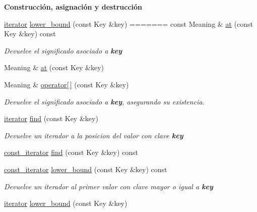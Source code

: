 \begin{Indent}{\bf \-Construcción, asignación y destrucción}
\begin{Indent}
\begin{DoxyCompactItemize}
\hyperlink{classaed2_1_1iterator_1_1iterator}{iterator} \hyperlink{classaed2_1_1iterator_ac48bbb54fea69c1fb4c093eecda02c5a_ac48bbb54fea69c1fb4c093eecda02c5a}{lower\-\_\-bound} (const \-Key \&key)
=======
const Meaning \& \hyperlink{classaed2_1_1iterator_a5a443b1a5d288b9512a6698b92cb415d_a5a443b1a5d288b9512a6698b92cb415d}{at} (const Key \&key) const
\begin{DoxyCompactList}\small\item\em Devuelve el significado asociado a {\bfseries key} \end{DoxyCompactList}\item 
Meaning \& \hyperlink{classaed2_1_1iterator_ac0459c685868fba041b9be2cde974119_ac0459c685868fba041b9be2cde974119}{at} (const Key \&key)
\item 
Meaning \& \hyperlink{classaed2_1_1iterator_af74d214f3278d8cd6b3a5a721e173fa3_af74d214f3278d8cd6b3a5a721e173fa3}{operator\mbox{[}$\,$\mbox{]}} (const Key \&key)
\begin{DoxyCompactList}\small\item\em Devuelve el significado asociado a {\bfseries key}, asegurando su existencia. \end{DoxyCompactList}\item 
\hyperlink{classaed2_1_1iterator_1_1iterator}{iterator} \hyperlink{classaed2_1_1iterator_a3d87256cbfc935a932677092ec57f49a_a3d87256cbfc935a932677092ec57f49a}{find} (const Key \&key)
\begin{DoxyCompactList}\small\item\em Devuelve un iterador a la posicion del valor con clave {\bfseries key} \end{DoxyCompactList}\item 
\hyperlink{classaed2_1_1iterator_1_1const__iterator}{const\+\_\+iterator} \hyperlink{classaed2_1_1iterator_a21b4a52c60fc70ef482e174325e8fec5_a21b4a52c60fc70ef482e174325e8fec5}{find} (const Key \&key) const
\item 
\hyperlink{classaed2_1_1iterator_1_1const__iterator}{const\+\_\+iterator} \hyperlink{classaed2_1_1iterator_aa7366926b6328e4f2e80484944408cbc_aa7366926b6328e4f2e80484944408cbc}{lower\+\_\+bound} (const Key \&key) const
\begin{DoxyCompactList}\small\item\em Devuelve un iterador al primer valor con clave mayor o igual a {\bfseries key} \end{DoxyCompactList}\item 
\hyperlink{classaed2_1_1iterator_1_1iterator}{iterator} \hyperlink{classaed2_1_1iterator_ac48bbb54fea69c1fb4c093eecda02c5a_ac48bbb54fea69c1fb4c093eecda02c5a}{lower\+\_\+bound} (const Key \&key)

\end{DoxyCompactItemize}
\end{Indent}
\end{Indent}
